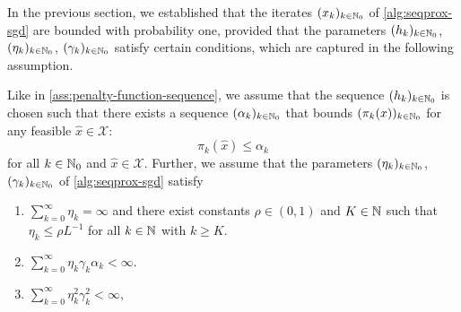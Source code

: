 In the previous section, we established that the iterates $(x_k)_{k\in\mathbb{N}_0}$
of \cref{alg:seqprox-sgd} are bounded with probability one,
provided that the parameters $(h_k)_{k\in\mathbb{N}_0}$, $(\eta_k)_{k\in\mathbb{N}_0}$, $(\gamma_k)_{k\in\mathbb{N}_0}$
satisfy certain conditions, which are captured in the following assumption.
\begin{assumption}
    \label{ass:step-sizes-and-penalties}
    Like in \cref{ass:penalty-function-sequence}, we assume that the sequence $(h_k)_{k\in\mathbb{N}_0}$
    is chosen such that there exists a
    sequence $(\alpha_k)_{k\in\mathbb{N}_0}$ that bounds $(\pi_k(x))_{k\in\mathbb{N}_0}$ for
    any feasible $\hat{x}\in\mathcal{X}$:
    \[
        \pi_k(\hat{x}) \leq \alpha_k
    \]
    for all $k\in\mathbb{N}_0$ and $\hat{x}\in\mathcal{X}$.
    Further, we assume that the parameters
    $(\eta_k)_{k\in\mathbb{N}_0}$, $(\gamma_k)_{k\in\mathbb{N}_0}$ of
    \cref{alg:seqprox-sgd} satisfy
    \begin{enumerate}
        \item $\sum_{k=0}^\infty \eta_k = \infty$ and there exist constants $\rho\in(0,1)$ and $K\in\mathbb{N}$
            such that $\eta_k \leq \rho L^{-1}$ for all $k\in\mathbb{N}$ with $k\geq K$.
        \item $\sum_{k=0}^\infty \eta_k\gamma_k\alpha_k < \infty$.
        \item $\sum_{k=0}^\infty \eta_k^2 \gamma_k^2 < \infty$,
    \end{enumerate}
\end{assumption}

